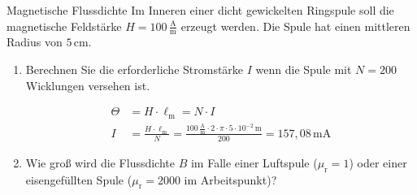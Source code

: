 \begin{frame} 
	\begin{bsp}{Magnetische Flussdichte}{}
		Im Inneren einer dicht gewickelten Ringspule soll die magnetische Feldstärke $H=100\,\frac{\mathrm{A}}{\mathrm{m}}$ erzeugt werden. Die Spule hat einen mittleren Radius von $5\,\mathrm{cm}$.
		\begin{enumerate}
			\item Berechnen Sie die erforderliche Stromstärke $I$ wenn die Spule mit $N=200$ Wicklungen versehen ist.\pause
			      
			      \begin{align*}
				      \varTheta & = H \cdot \ell_{\mathrm{m}} = N\cdot I                                                                                                                  \\
				      I         & =\frac{H\cdot\ell_{\mathrm{m}}}{N}=\frac{100\,\frac{\mathrm{A}}{\mathrm{m}}\cdot 2\cdot \pi\cdot 5\cdot 10^{-2}\,\mathrm{m}}{200} = 157,08\,\mathrm{mA}
			      \end{align*}\pause
			\item Wie groß wird die Flussdichte $B$ im Falle einer Luftspule ($\mu_{\mathrm{r}}=1$) oder einer eisengefüllten Spule ($\mu_{\mathrm{r}}=2000$ im Arbeitspunkt)?\pause
			      

\end{enumerate}
\end{bsp}
\end{frame}
